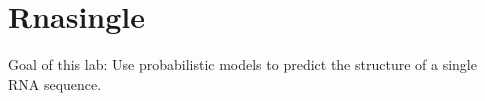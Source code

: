 \chapter{Rnasingle}

Goal of this lab:
Use probabilistic models to predict the structure of a single RNA sequence.

